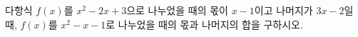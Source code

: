 다항식 $f(x)$를 $x^2-2x+3$으로 나누었을 때의 몫이 $x-1$이고 나머지가 $3x-2$일 때, $f(x)$를 $x^2-x-1$로 나누었을 때의 몫과 나머지의 합을 구하시오.
